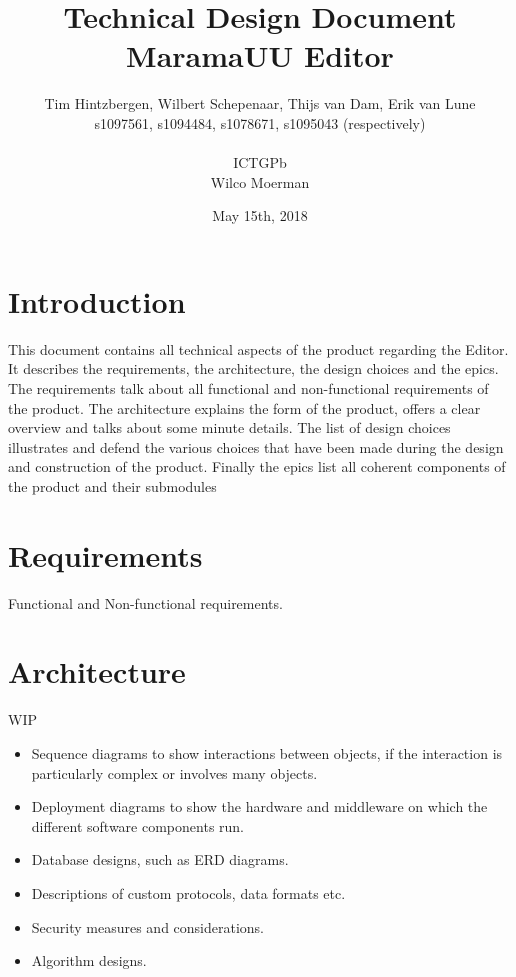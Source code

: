 \documentclass[10pt]{extarticle} %
\title{\huge Technical Design Document MaramaUU Editor}
\author{Tim Hintzbergen, Wilbert Schepenaar, Thijs van Dam, Erik van Lune    \\s1097561, s1094484, s1078671, s1095043 (respectively)
\\\\ICTGPb
\\Wilco Moerman}
\date{May 15th, 2018}
\begin{document}
    \nocite{*}
    \maketitle
    \thispagestyle{empty}
    \newpage
    \newpage
    \setcounter{page}{1}
    \section {Introduction}
    This document contains all technical aspects of the product regarding the Editor.
    It describes the requirements, the architecture, the design choices and the epics.
    The requirements talk about all functional and non-functional requirements of the product.
    The architecture explains the form of the product, offers a clear overview and talks about some minute details.
    The list of design choices illustrates and defend the various choices that have been made during the design and construction of the product.
    Finally the epics list all coherent components of the product and their submodules
    \newpage

    \tableofcontents{}
    \newpage

    \section{Requirements}
    Functional and Non-functional requirements.
    \newpage

    \section{Architecture}
    WIP
    \begin{itemize}
              \item Sequence diagrams to show interactions between objects, if the interaction is particularly complex or involves many objects.
              \item Deployment diagrams to show the hardware and middleware on which the different software components run.
              \item Database designs, such as ERD diagrams.
              \item Descriptions of custom protocols, data formats etc.
              \item Security measures and considerations.
              \item Algorithm designs.
    \end{itemize}
\end{document}
